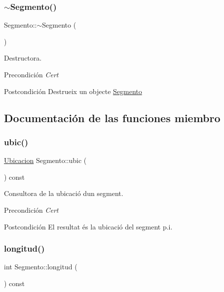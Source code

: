 \subsubsection{\texorpdfstring{$\sim$\+Segmento()}{~Segmento()}}
{\footnotesize\ttfamily Segmento\+::$\sim$\+Segmento (\begin{DoxyParamCaption}{ }\end{DoxyParamCaption})}



Destructora. 

\begin{DoxyPrecond}{Precondición}
{\itshape Cert} 
\end{DoxyPrecond}
\begin{DoxyPostcond}{Postcondición}
Destrueix un objecte \hyperlink{class_segmento}{Segmento} 
\end{DoxyPostcond}


\subsection{Documentación de las funciones miembro}
\mbox{\label{class_segmento_aeb7bfd4dcac3a1a000a33582861e0d50}} 
\subsubsection{\texorpdfstring{ubic()}{ubic()}}
{\footnotesize\ttfamily \hyperlink{class_ubicacion}{Ubicacion} Segmento\+::ubic (\begin{DoxyParamCaption}{ }\end{DoxyParamCaption}) const}



Consultora de la ubicació d\textquotesingle{}un segment. 

\begin{DoxyPrecond}{Precondición}
{\itshape Cert} 
\end{DoxyPrecond}
\begin{DoxyPostcond}{Postcondición}
El resultat és la ubicació del segment p.\+i. 
\end{DoxyPostcond}
\mbox{\label{class_segmento_a61c7347eb37045bef7655d3db24d7fd9}} 
\subsubsection{\texorpdfstring{longitud()}{longitud()}}
{\footnotesize\ttfamily int Segmento\+::longitud (\begin{DoxyParamCaption}{ }\end{DoxyParamCaption}) const}



